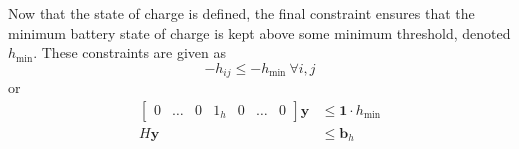 Now that the state of charge is defined, the final constraint ensures that the minimum battery state of charge is kept above some minimum threshold, denoted $h_{\text{min}}$. These constraints are given as
\begin{equation}
	-h_{ij} \le -h_{\text{min}} \ \forall i,j
\end{equation}
or 
\begin{equation} \begin{aligned}
	\begin{bmatrix}0 & \hdots & 0 & 1_{h} & 0 & \hdots & 0\end{bmatrix} \mathbf{y} &\le \mathbf{1}\cdot h_{\text{min}}\\ 
		H\mathbf{y} &\le \mathbf{b}_h
\end{aligned} \end{equation}

